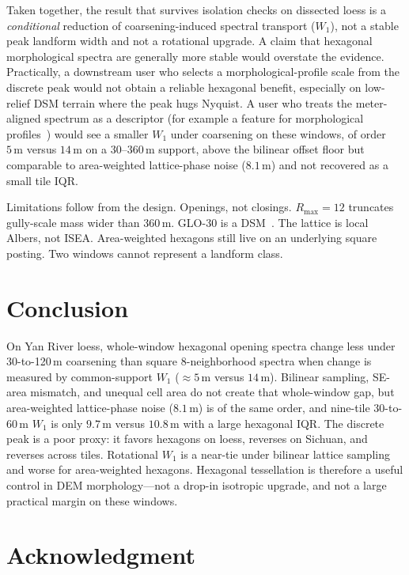 \documentclass[journal]{IEEEtran}
\newif\ifhighlight
\newcommand{\rev}[1]{\ifhighlight\textcolor{blue}{#1}\else#1\fi}
\begin{document}
Taken together, the result that survives isolation checks on dissected loess is
a \emph{conditional} reduction of coarsening-induced spectral transport (\(W_1\)),
not a stable peak landform width and not a rotational upgrade.
A claim that hexagonal morphological spectra are generally more stable would
overstate the evidence.
\rev{Practically, a downstream user who selects a morphological-profile scale from
the discrete peak would not obtain a reliable hexagonal benefit, especially on
low-relief DSM terrain where the peak hugs Nyquist.
A user who treats the meter-aligned spectrum as a descriptor (for example a
feature for morphological profiles~\cite{pesaresi2001new}) would see a smaller
\(W_1\) under coarsening on these windows, of order \(5\,\mathrm{m}\) versus
\(14\,\mathrm{m}\) on a \(30\)--\(360\,\mathrm{m}\) support, above the bilinear
offset floor but comparable to area-weighted lattice-phase noise
(\(8.1\,\mathrm{m}\)) and not recovered as a small tile IQR.}

Limitations follow from the design. Openings, not closings. \(R_{\max}=12\)
truncates gully-scale mass wider than \(360\,\mathrm{m}\).
GLO-30 is a DSM~\cite{guth2021lidar,simard2024global}.
The lattice is local Albers, not ISEA.
Area-weighted hexagons still live on an underlying square posting.
Two windows cannot represent a landform class.

\section{Conclusion}

\rev{On Yan River loess, whole-window hexagonal opening spectra change less under
30-to-120\,m coarsening than square 8-neighborhood spectra when change is
measured by common-support \(W_1\) (\(\approx 5\,\mathrm{m}\) versus
\(14\,\mathrm{m}\)).
Bilinear sampling, SE-area mismatch, and unequal cell area do not create that
whole-window gap, but area-weighted lattice-phase noise (\(8.1\,\mathrm{m}\))
is of the same order, and nine-tile 30-to-60\,m \(W_1\) is only \(9.7\,\mathrm{m}\)
versus \(10.8\,\mathrm{m}\) with a large hexagonal IQR.
The discrete peak is a poor proxy: it favors hexagons on loess, reverses on
Sichuan, and reverses across tiles.
Rotational \(W_1\) is a near-tie under bilinear lattice sampling and worse for
area-weighted hexagons.
Hexagonal tessellation is therefore a useful control in DEM morphology---not a
drop-in isotropic upgrade, and not a large practical margin on these windows.}

\section*{Acknowledgment}
\end{document}
